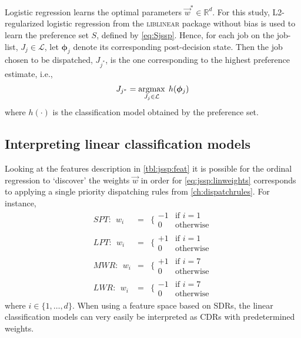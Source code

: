\documentclass[smallextended]{svjour3}
\renewcommand{\vphi}{\bm \phi}
\begin{document}
Logistic regression learns the optimal parameters $\vec{w}^*\in\mathbb{R}^d$. 
For this study, L2-regularized logistic regression from the \textsc{liblinear} 
package \citep{liblinear} without bias is used to learn the preference set $S$, 
defined by \eqref{eq:Sjssp}.
Hence, for each job on the job-list, $J_j\in\mathcal{L}$, let $\vphi_j$ denote 
its corresponding  post-decision state. Then the job chosen to be dispatched, 
$J_{j^*}$, is the one corresponding to the highest preference estimate, i.e.,
\begin{equation}\label{eq:lin}
	J_{j^*}=\argmax_{J_j\in \mathcal{L}}\; h(\vphi_j)
\end{equation}
where $h(\cdot)$ is the classification model obtained by the preference set.

\subsection{Interpreting linear classification 
	models}\label{sec:learningmodels:interpret}
Looking at the features description in \cref{tbl:jssp:feat} it is possible for 
the ordinal regression to `discover' the weights $\vec{w}$ in order for 
\eqref{eq:jssp:linweights} corresponds to applying a single priority 
dispatching rules from \cref{ch:dispatchrules}. For instance, 
\begin{eqnarray*} %
	SPT:~~w_i&=&\bigg\{ \begin{array}{rl}-1&\text{if 
		}i=1\\0&\text{otherwise}\end{array} \\
	LPT:~~w_i&=&\bigg\{ \begin{array}{rl}+1&\text{if 
		}i=1\\0&\text{otherwise}\end{array} \\
	MWR:~~w_i&=&\bigg\{ \begin{array}{rl}+1&\text{if 
		}i=7\\0&\text{otherwise}\end{array} \\
	LWR:~~w_i&=&\bigg\{ \begin{array}{rl}-1&\text{if 
		}i=7\\0&\text{otherwise}\end{array}
\end{eqnarray*}
where $i\in\{1,\ldots,d\}$. %
When using a feature space based on SDRs, the linear classification models can 
very easily be interpreted as CDRs with predetermined weights.
\end{document}
